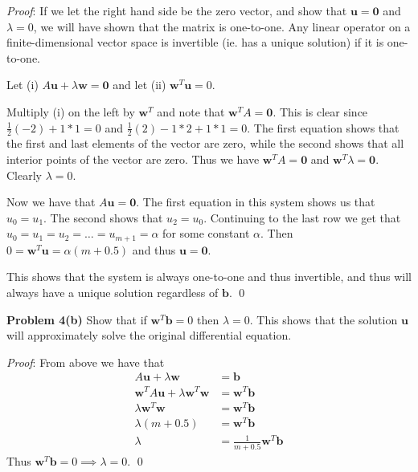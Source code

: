 \documentclass[12pt]{article}
\newcommand{\problem}[1]{\hspace{-4 ex} \large \textbf{Problem #1} }
\renewenvironment{proof}{\hspace{-4 ex} \emph{Proof}:}{\qed}
\renewcommand{\vec}[1]{\boldsymbol{\mathbf{#1}}}
\begin{document}
\begin{proof}
	If we let the right hand side be the zero vector, and show that $\vec{u}=\vec{0}$ and $\lambda=0$, we will have shown that the matrix is one-to-one. Any linear operator on a finite-dimensional vector space is invertible (ie. has a unique solution) if it is one-to-one. \bigbreak
	
	Let (i) $A\vec{u} + \lambda \vec{w} = \vec{0}$ and let (ii) $\vec{w}^T\vec{u} = 0$. \bigbreak
	
	Multiply (i) on the left by $\vec{w}^T$ and note that $\vec{w}^TA = \vec{0}$. This is clear since $\frac{1}{2}(-2) + 1*1 = 0$ and $\frac{1}{2}(2) - 1*2 + 1*1=0 $. The first equation shows that the first and last elements of the vector are zero, while the second shows that all interior points of the vector are zero. Thus we have $\vec{w}^TA = \vec{0}$ and $\vec{w}^T \lambda =\vec{0}$. Clearly $\lambda = 0$. \bigbreak
	
	Now we have that $A\vec{u} = \vec{0}$. The first equation in this system shows us that $u_0 = u_1$. The second shows that $u_2 = u_0$. Continuing to the last row we get that $u_0 = u_1 = u_2 = \dots = u_{m+1} = \alpha$ for some constant $\alpha$. Then $0 = \vec{w}^T\vec{u} = \alpha(m+0.5)$ and thus $\vec{u} = \vec{0}$. \bigbreak
	
	This shows that the system is always one-to-one and thus invertible, and thus will always have a unique solution regardless of $\vec{b}$.
\end{proof}

\bigbreak
\problem{4(b)} Show that if $\vec{w}^T\vec{b} = 0$ then $\lambda = 0$. This shows that the solution $\vec{u}$ will approximately solve the original differential equation. \bigbreak

\begin{proof}
	From above we have that
	\begin{align*}
		A\vec{u} + \lambda \vec{w}&= \vec{b} \\
		\vec{w}^T A\vec{u} + \lambda \vec{w}^T \vec{w} &= \vec{w}^T \vec{b} \\
		\lambda \vec{w}^T \vec{w} &= \vec{w}^T \vec{b} \\
		\lambda (m+0.5) &= \vec{w}^T \vec{b} \\
		\lambda &= \frac{1}{m+0.5} \vec{w}^T \vec{b}
	\end{align*}
	Thus $\vec{w}^T \vec{b} = 0 \implies \lambda=0$.
\end{proof}
\end{document}
